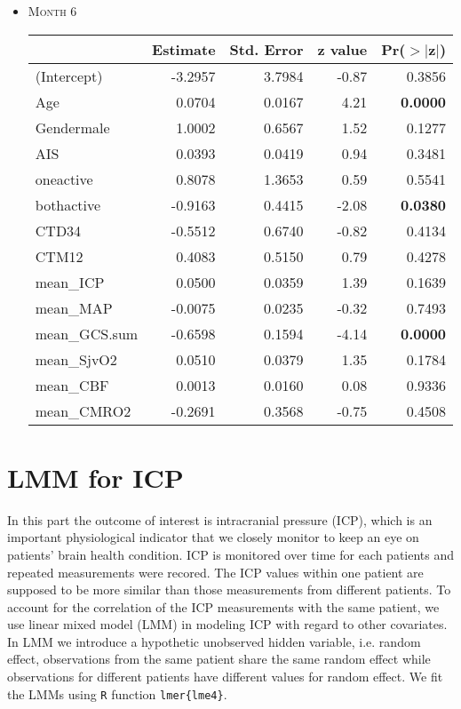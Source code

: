 \documentclass{article}
\begin{document}
\begin{itemize}
\item \textsc{Month 6}
\begin{table}[H]
\centering
\begin{tabular}{lrrrr}
  \hline
 & Estimate & Std. Error & z value & Pr($>$$|$z$|$) \\ 
  \hline
(Intercept) & -3.2957 & 3.7984 & -0.87 & 0.3856 \\ 
  Age & 0.0704 & 0.0167 & 4.21 & {\bf 0.0000} \\ 
  Gendermale & 1.0002 & 0.6567 & 1.52 & 0.1277 \\ 
  AIS & 0.0393 & 0.0419 & 0.94 & 0.3481 \\ 
  oneactive & 0.8078 & 1.3653 & 0.59 & 0.5541 \\ 
  bothactive & -0.9163 & 0.4415 & -2.08 & {\bf 0.0380} \\ 
  CTD34 & -0.5512 & 0.6740 & -0.82 & 0.4134 \\ 
  CTM12 & 0.4083 & 0.5150 & 0.79 & 0.4278 \\ 
  mean\_ICP & 0.0500 & 0.0359 & 1.39 & 0.1639 \\ 
  mean\_MAP & -0.0075 & 0.0235 & -0.32 & 0.7493 \\ 
  mean\_GCS.sum & -0.6598 & 0.1594 & -4.14 & {\bf 0.0000} \\ 
  mean\_SjvO2 & 0.0510 & 0.0379 & 1.35 & 0.1784 \\ 
  mean\_CBF & 0.0013 & 0.0160 & 0.08 & 0.9336 \\ 
  mean\_CMRO2 & -0.2691 & 0.3568 & -0.75 & 0.4508 \\ 
   \hline
\end{tabular}
\end{table}
\end{itemize}






\newpage
\section{LMM for ICP}
In this part the outcome of interest is intracranial pressure (ICP), which is an important physiological indicator that we closely monitor to keep an eye on patients' brain health condition. ICP is monitored over time for each patients and repeated measurements were recored. The ICP values within one patient are supposed to be more similar than those measurements from different patients. To account for the correlation of the ICP measurements with the same patient, we use linear mixed model (LMM) in modeling ICP with regard to other covariates. In LMM we introduce a hypothetic unobserved hidden variable, i.e. random effect, observations from the same patient share the same random effect while observations for different patients have different values for random effect. We fit the LMMs using \verb'R' \cite{team2012r} function \verb'lmer{lme4}'\cite{bates2012lme4}.
\end{document}
